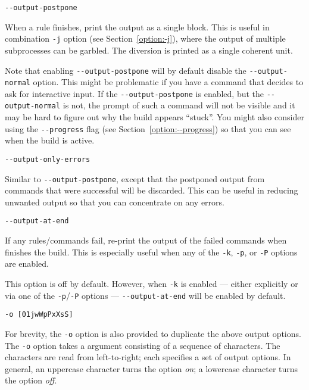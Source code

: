  \verb+--output-postpone+

When a rule finishes, print the output as a single block.  This is useful in combination \verb+-j+
option (see Section~\ref{option:-j}), where the output of multiple subprocesses can be garbled.  The
diversion is printed as a single coherent unit.

Note that enabling \verb+--output-postpone+ will by default disable the \verb+--output-normal+
option. This might be problematic if you have a command that decides to ask for interactive input.
If the \verb+--output-postpone+ is enabled, but the \verb+--output-normal+ is not, the prompt of
such a command will not be visible and it may be hard to figure out why the build appears ``stuck''.
You might also consider using the \verb+--progress+ flag (see Section~\ref{option:--progress}) so
that you can see when the build is active. 

 \verb+--output-only-errors+ 

Similar to \verb+--output-postpone+, except that the postponed output from commands that were
successful will be discarded. This can be useful in reducing unwanted output so that you can
concentrate on any errors.

 \verb+--output-at-end+

If any rules/commands fail, re-print the output of the failed commands when \OMake{} finishes the
build. This is especially useful when any of the \verb+-k+, \verb+-p+, or \verb+-P+ options are
enabled.

This option is off by default. However, when \verb+-k+ is enabled --- either explicitly or via one
of the \verb+-p+/\verb+-P+ options --- \verb+--output-at-end+ will be enabled by default.

 \verb+-o [01jwWpPxXsS]+

For brevity, the \verb+-o+ option is also provided to duplicate the above output options.  The
\verb+-o+ option takes a argument consisting of a sequence of characters.  The characters are read
from left-to-right; each specifies a set of output options.  In general, an uppercase character turns
the option \emph{on}; a lowercase character turns the option \emph{off}.

